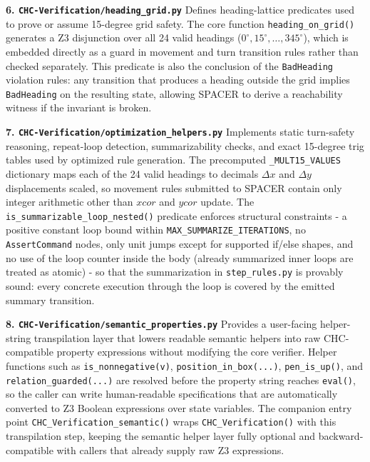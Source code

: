 \textbf{6. \texttt{CHC-Verification/heading\_grid.py}}
Defines heading-lattice predicates used to prove or assume 15-degree grid safety.
The core function \texttt{heading\_on\_grid()} generates a Z3 disjunction over all 24 valid headings ($0^\circ, 15^\circ, \ldots, 345^\circ$), which is embedded directly as a guard in movement and turn transition rules rather than checked separately.
This predicate is also the conclusion of the \texttt{BadHeading} violation rules: any transition that produces a heading outside the grid implies \texttt{BadHeading} on the resulting state, allowing SPACER to derive a reachability witness if the invariant is broken.

\textbf{7. \texttt{CHC-Verification/optimization\_helpers.py}}
Implements static turn-safety reasoning, repeat-loop detection, summarizability checks, and exact 15-degree trig tables used by optimized rule generation.
The precomputed \texttt{\_MULT15\_VALUES} dictionary maps each of the 24 valid headings to decimals \(\Delta x\) and \(\Delta y\) displacements scaled, so movement rules submitted to SPACER contain only integer arithmetic other than $xcor$ and $ycor$ update.
The \texttt{is\_summarizable\_loop\_nested()} predicate enforces structural constraints - a positive constant loop bound within \texttt{MAX\_SUMMARIZE\_ITERATIONS}, no \texttt{AssertCommand} nodes, only unit jumps except for supported if/else shapes, and no use of the loop counter inside the body (already summarized inner loops are treated as atomic) - so that the summarization in \texttt{step\_rules.py} is provably sound: every concrete execution through the loop is covered by the emitted summary transition.

\textbf{8. \texttt{CHC-Verification/semantic\_properties.py}}
Provides a user-facing helper-string transpilation layer that lowers readable semantic helpers into raw CHC-compatible property expressions without modifying the core verifier.
Helper functions such as \texttt{is\_nonnegative(v)}, \texttt{position\_in\_box(...)}, \texttt{pen\_is\_up()}, and \texttt{relation\_guarded(...)} are resolved before the property string reaches \texttt{eval()}, so the caller can write human-readable specifications that are automatically converted to Z3 Boolean expressions over state variables.
The companion entry point \texttt{CHC\_Verification\_semantic()} wraps \texttt{CHC\_Verification()} with this transpilation step, keeping the semantic helper layer fully optional and backward-compatible with callers that already supply raw Z3 expressions.

